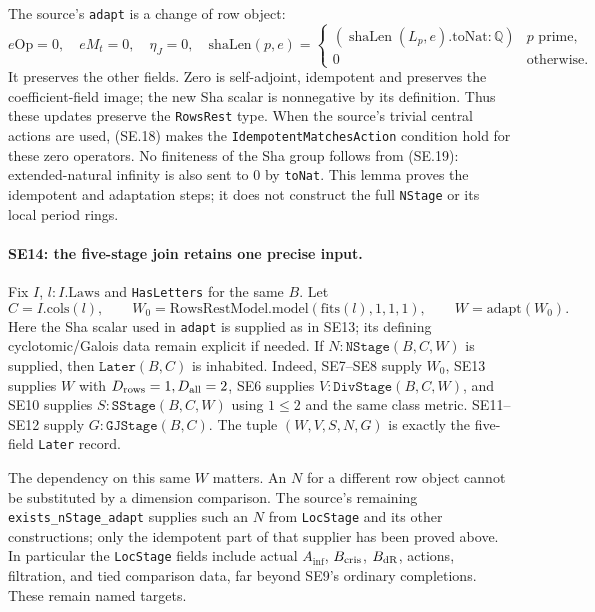 The source's \texttt{adapt} is a change of row object:
\[
 e\mathrm{Op}=0,\quad eM_t=0,\quad\eta_J=0,
 \quad\mathrm{shaLen}(p,e)=
 \begin{cases}(\operatorname{shaLen}(L_p,e).\mathrm{toNat}:\mathbb Q)
                       &p\text{ prime},\\0&\text{otherwise}.
 \end{cases}
 \tag{SE.19}
\]
It preserves the other fields. Zero is self-adjoint, idempotent and
preserves the coefficient-field image; the new Sha scalar is
nonnegative by its definition. Thus these updates preserve the
\texttt{RowsRest} type. When the source's trivial central actions are
used, (SE.18) makes the \texttt{IdempotentMatchesAction} condition
hold for these zero operators. No finiteness of the Sha group follows
from (SE.19): extended-natural infinity is also sent to $0$ by
\texttt{toNat}. This lemma proves the idempotent and adaptation steps;
it does not construct the full \texttt{NStage} or its local period rings.

\paragraph{SE14: the five-stage join retains one precise input.}
Fix $I$, $l:I.\mathrm{Laws}$ and \texttt{HasLetters} for the same
$B$. Let
\[
 C=I.\mathrm{cols}(l),\qquad
 W_0=\mathrm{RowsRestModel.model}(\mathrm{fits}(l),1,1,1),
 \qquad W=\mathrm{adapt}(W_0).
 \tag{SE.20}
\]
Here the Sha scalar used in \texttt{adapt} is supplied as in SE13;
its defining cyclotomic/Galois data remain explicit if needed.
If $N:\texttt{NStage}(B,C,W)$ is supplied, then
$\texttt{Later}(B,C)$ is inhabited. Indeed, SE7--SE8 supply $W_0$,
SE13 supplies $W$ with $D_{\rm rows}=1,D_{\rm all}=2$,
SE6 supplies $V:\texttt{DivStage}(B,C,W)$, and SE10 supplies
$S:\texttt{SStage}(B,C,W)$ using $1\le2$ and the same class metric.
SE11--SE12 supply $G:\texttt{GJStage}(B,C)$. The tuple
$(W,V,S,N,G)$ is exactly the five-field \texttt{Later} record.

The dependency on this same $W$ matters. An $N$ for a different row
object cannot be substituted by a dimension comparison. The source's
remaining \texttt{exists\_nStage\_adapt} supplies such an $N$ from
\texttt{LocStage} and its other constructions; only the idempotent
part of that supplier has been proved above. In particular the
\texttt{LocStage} fields include actual $A_{\inf}$, $B_{\rm cris}$,
$B_{\rm dR}$, actions, filtration, and tied comparison data, far
beyond SE9's ordinary completions. These remain named targets.

